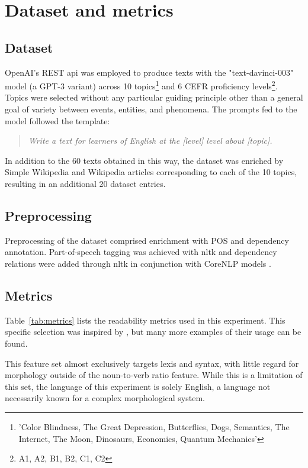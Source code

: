 \documentclass[11pt]{article}
\begin{document}
\section{Dataset and metrics}
\subsection{Dataset}

OpenAI's REST api was employed to produce texts with the "text-davinci-003" model (a GPT-3 variant) across 10 topics\footnote{'Color Blindness, The Great Depression, Butterflies, Dogs, Semantics, The Internet, The Moon, Dinosaurs, Economics, Quantum Mechanics'} and 6 CEFR proficiency levels\footnote{A1, A2, B1, B2, C1, C2}. Topics were selected without any particular guiding principle other than a general goal of variety between events, entities, and phenomena. The prompts fed to the model followed the template:

\begin{quote}
  \emph{Write a text for learners of English at the [level] level about [topic].}
\end{quote}

In addition to the 60 texts obtained in this way, the dataset was enriched by Simple Wikipedia and Wikipedia articles corresponding to each of the 10 topics, resulting in an additional 20 dataset entries.

\subsection{Preprocessing}

Preprocessing of the dataset comprised enrichment with POS and dependency annotation. Part-of-speech tagging was achieved with nltk \citep{LoperBird02} and dependency relations were added through nltk in conjunction with CoreNLP models \citep{corenlp}.

\subsection{Metrics}



Table~\ref{tab:metrics} lists the readability metrics used in this experiment. This specific selection was inspired by \citep{venturi-etal-2015-nlp}, but many more examples of their usage can be found. 

This feature set almost exclusively targets lexis and syntax, with little regard for morphology outside of the noun-to-verb ratio feature. While this is a limitation of this set, the language of this experiment is solely English, a language not necessarily known for a complex morphological system.
\end{document}
